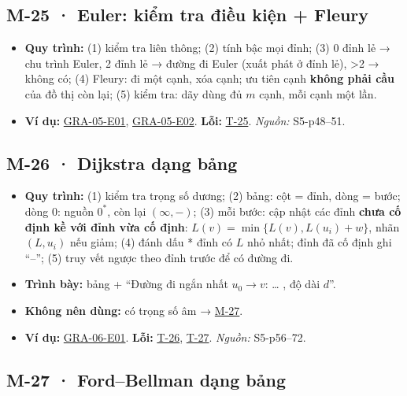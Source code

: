 \documentclass[
  10pt,
  twoside,openany]{book}
\providecommand{\tightlist}{%
  \setlength{\itemsep}{0pt}\setlength{\parskip}{0pt}}
\begin{document}
\hypertarget{M-25}{%
\subsection{M-25 · Euler: kiểm tra điều kiện + Fleury}\label{M-25}}

\begin{itemize}
\tightlist
\item
  \textbf{Quy trình:} (1) kiểm tra liên thông; (2) tính bậc mọi đỉnh;
  (3) 0 đỉnh lẻ → chu trình Euler, 2 đỉnh lẻ → đường đi Euler (xuất phát
  ở đỉnh lẻ), \textgreater2 → không có; (4) Fleury: đi một cạnh, xóa
  cạnh; ưu tiên cạnh \textbf{không phải cầu} của đồ thị còn lại; (5)
  kiểm tra: dãy dùng đủ \(m\) cạnh, mỗi cạnh một lần.
\item
  \textbf{Ví dụ:} \protect\hyperlink{GRA-05-E01}{GRA-05-E01},
  \protect\hyperlink{GRA-05-E02}{GRA-05-E02}. \textbf{Lỗi:}
  \protect\hyperlink{T-25}{T-25}. \emph{Nguồn:} S5-p48--51.
\end{itemize}

\hypertarget{M-26}{%
\subsection{M-26 · Dijkstra dạng bảng}\label{M-26}}

\begin{itemize}
\tightlist
\item
  \textbf{Quy trình:} (1) kiểm tra trọng số dương; (2) bảng: cột = đỉnh,
  dòng = bước; dòng 0: nguồn \(0^*\), còn lại \((\infty,-)\); (3) mỗi
  bước: cập nhật các đỉnh \textbf{chưa cố định kề với đỉnh vừa cố định}:
  \(L(v)=\min\{L(v),L(u_i)+w\}\), nhãn \((L,u_i)\) nếu giảm; (4) đánh
  dấu * đỉnh có \(L\) nhỏ nhất; đỉnh đã cố định ghi ``--''; (5) truy vết
  ngược theo đỉnh trước để có đường đi.
\item
  \textbf{Trình bày:} bảng + ``Đường đi ngắn nhất \(u_0\to v\): \ldots{}
  , độ dài \(d\)''.
\item
  \textbf{Không nên dùng:} có trọng số âm →
  \protect\hyperlink{M-27}{M-27}.
\item
  \textbf{Ví dụ:} \protect\hyperlink{GRA-06-E01}{GRA-06-E01}.
  \textbf{Lỗi:} \protect\hyperlink{T-26}{T-26},
  \protect\hyperlink{T-27}{T-27}. \emph{Nguồn:} S5-p56--72.
\end{itemize}

\hypertarget{M-27}{%
\subsection{M-27 · Ford--Bellman dạng bảng}\label{M-27}}
\end{document}
